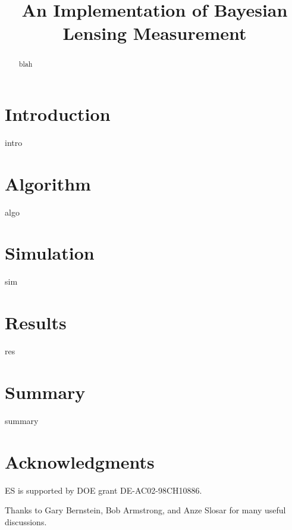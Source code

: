 \documentclass[12pt,preprint]{aastex}
\begin{document}
\title{An Implementation of Bayesian Lensing Measurement}



\begin{abstract}

blah

\end{abstract}

\section{Introduction} \label{sec:intro}

intro

\section{Algorithm} \label{sec:algo}

algo

\section{Simulation} \label{sec:sim}

sim

\section{Results} \label{sec:results}

res

\section{Summary} \label{sec:summary}

summary

\section*{Acknowledgments}

ES is supported by DOE grant DE-AC02-98CH10886.

Thanks to Gary Bernstein, Bob Armstrong, and Anze Slosar for many useful
discussions.



\end{document}

